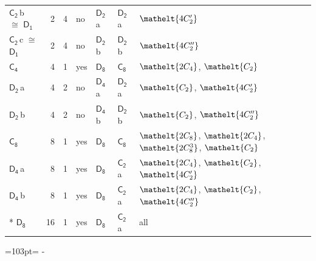 \documentclass[10pt,a4paper]{article}
\newcommand{\needspace}[1]{\par\penalty-100\begingroup\dimen0=#1\relax\dimen2=\pagegoal
  \advance\dimen2-\pagetotal\ifdim\dimen0>\dimen2\relax\ifdim\dimen2>0pt\vfil\break\fi\fi
  \endgroup}
\numberwithin{equation}{section}
\newcommand{\eltfont}[1]{{\let\sigma\eltsigma\mathelt{#1}}}
\newcommand{\grp}[1]{\mathsf{#1}}
\newcommand{\cls}[1]{\eltfont{#1}}
\newcommand{\samecls}{\cong}
\newcommand{\clsletter}[1]{\,{\scriptsize\color{black!55}#1}}
\newlength{\fillwidth}\newlength{\cellwidth}\newlength{\colwidth}
\begin{document}
{\begin{longtable}{@{}lrrlll>{\RaggedRight\arraybackslash}p{\fillwidth}@{}}
\href{C2.pdf}{$\grp{C_{2}}$}\clsletter{b} $\samecls$ \href{D1.pdf}{$\grp{D_{1}}$} & 2 & 4 & no & \href{D2.pdf}{$\grp{D_{2}}$}\clsletter{a} & \href{D2.pdf}{$\grp{D_{2}}$}\clsletter{a} & $\cls{4C_{2}'}$\\
\href{C2.pdf}{$\grp{C_{2}}$}\clsletter{c} $\samecls$ \href{D1.pdf}{$\grp{D_{1}}$} & 2 & 4 & no & \href{D2.pdf}{$\grp{D_{2}}$}\clsletter{b} & \href{D2.pdf}{$\grp{D_{2}}$}\clsletter{b} & $\cls{4C_{2}''}$\\
\href{C4.pdf}{$\grp{C_{4}}$} & 4 & 1 & yes & \href{D8.pdf}{$\grp{D_{8}}$} & \href{C8.pdf}{$\grp{C_{8}}$} & $\cls{2C_{4}}$, $\cls{C_{2}}$\\
\href{D2.pdf}{$\grp{D_{2}}$}\clsletter{a} & 4 & 2 & no & \href{D4.pdf}{$\grp{D_{4}}$}\clsletter{a} & \href{D2.pdf}{$\grp{D_{2}}$}\clsletter{a} & $\cls{C_{2}}$, $\cls{4C_{2}'}$\\
\href{D2.pdf}{$\grp{D_{2}}$}\clsletter{b} & 4 & 2 & no & \href{D4.pdf}{$\grp{D_{4}}$}\clsletter{b} & \href{D2.pdf}{$\grp{D_{2}}$}\clsletter{b} & $\cls{C_{2}}$, $\cls{4C_{2}''}$\\
\href{C8.pdf}{$\grp{C_{8}}$} & 8 & 1 & yes & \href{D8.pdf}{$\grp{D_{8}}$} & \href{C8.pdf}{$\grp{C_{8}}$} & $\cls{2C_{8}}$, $\cls{2C_{4}}$, $\cls{2C_{8}^{3}}$, $\cls{C_{2}}$\\
\href{D4.pdf}{$\grp{D_{4}}$}\clsletter{a} & 8 & 1 & yes & \href{D8.pdf}{$\grp{D_{8}}$} & \href{C2.pdf}{$\grp{C_{2}}$}\clsletter{a} & $\cls{2C_{4}}$, $\cls{C_{2}}$, $\cls{4C_{2}'}$\\
\href{D4.pdf}{$\grp{D_{4}}$}\clsletter{b} & 8 & 1 & yes & \href{D8.pdf}{$\grp{D_{8}}$} & \href{C2.pdf}{$\grp{C_{2}}$}\clsletter{a} & $\cls{2C_{4}}$, $\cls{C_{2}}$, $\cls{4C_{2}''}$\\*
\href{D8.pdf}{$\grp{D_{8}}$} & 16 & 1 & yes & \href{D8.pdf}{$\grp{D_{8}}$} & \href{C2.pdf}{$\grp{C_{2}}$}\clsletter{a} & all\\
\bottomrule\end{longtable}}
\needspace{103pt}
\end{document}
